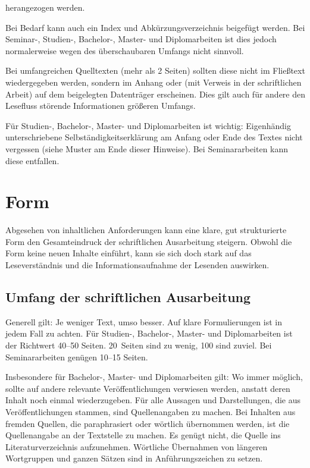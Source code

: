 \documentclass[
    fontsize=12pt,
    headings=small,
    parskip=half,           %
    bibliography=totoc,
    numbers=noenddot,       %
    open=any,               %
    ]{scrreprt}
\begin{document}
herangezogen werden.

Bei Bedarf kann auch ein Index und Abkürzungsverzeichnis beigefügt werden. Bei Seminar-, Studien-, Bachelor-, Master- und Diplomarbeiten ist dies jedoch normalerweise wegen des überschaubaren Umfangs nicht sinnvoll.

Bei umfangreichen Quelltexten (mehr als 2 Seiten) sollten diese nicht im Fließtext wiedergegeben werden, sondern im Anhang oder (mit Verweis in der schriftlichen Arbeit) auf dem beigelegten Datenträger erscheinen. Dies gilt auch für andere den Lesefluss störende Informationen größeren Umfangs.

Für Studien-, Bachelor-, Master- und Diplomarbeiten ist wichtig: Eigenhändig unterschriebene Selbständigkeitserklärung am Anfang oder Ende des Textes nicht vergessen (siehe Muster am Ende dieser Hinweise). Bei Seminararbeiten kann diese entfallen.

\chapter{Form}
\label{sec.form}

Abgesehen von inhaltlichen Anforderungen kann eine klare, gut strukturierte Form den Gesamteindruck der schriftlichen Ausarbeitung steigern. Obwohl die Form keine neuen Inhalte einführt, kann sie sich doch stark auf das Leseverständnis und die Informationsaufnahme der Lesenden auswirken. 

\section{Umfang der schriftlichen Ausarbeitung}
\label{sec.umfang}

Generell gilt: Je weniger Text, umso besser. Auf klare Formulierungen ist in jedem Fall zu achten. Für Studien-, Bachelor-, Master- und Diplomarbeiten ist der Richtwert 40--50 Seiten. 20~Seiten sind zu wenig, 100 sind zuviel. Bei Seminararbeiten genügen 10--15 Seiten.

Insbesondere für Bachelor-, Master- und Diplomarbeiten gilt: Wo immer möglich, sollte auf andere relevante Veröffentlichungen verwiesen werden, anstatt deren Inhalt noch einmal wiederzugeben. Für alle Aussagen und Darstellungen, die aus Veröffentlichungen stammen, sind Quellenangaben zu machen. Bei Inhalten aus fremden Quellen, die paraphrasiert oder wörtlich übernommen werden, ist die Quellenangabe an der Textstelle zu machen. Es genügt nicht, die Quelle ins Literaturverzeichnis aufzunehmen. Wörtliche Übernahmen von längeren Wortgruppen und ganzen Sätzen sind in Anführungszeichen zu setzen.
\end{document}

